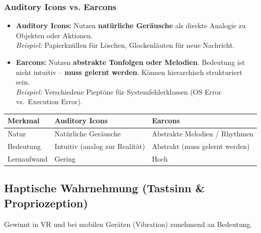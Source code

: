 \documentclass[12pt, a4paper]{article}
\begin{document}
\subsubsection{Auditory Icons vs. Earcons}

\begin{itemize}
  \item \textbf{Auditory Icons:} Nutzen \textbf{natürliche Geräusche} als direkte
        Analogie zu Objekten oder Aktionen.\\
        \textit{Beispiel:} Papierknüllen für \glqq{}Löschen\grqq{}, Glockenläuten
        für neue Nachricht.
  \item \textbf{Earcons:} Nutzen \textbf{abstrakte Tonfolgen oder Melodien}. Bedeutung
        ist nicht intuitiv -- \textbf{muss gelernt werden}. Können hierarchisch
        strukturiert sein.\\
        \textit{Beispiel:} Verschiedene Pieptöne für Systemfehlerklassen
        (\glqq{}OS Error\grqq{} vs.\ \glqq{}Execution Error\grqq{}).
\end{itemize}

\begin{center}
\begin{tabular}{p{3cm} p{5cm} p{5cm}}
\hline
\textbf{Merkmal} & \textbf{Auditory Icons} & \textbf{Earcons} \\
\hline
Natur       & Natürliche Geräusche           & Abstrakte Melodien / Rhythmen \\[3pt]
Bedeutung   & Intuitiv (analog zur Realität) & Abstrakt (muss gelernt werden) \\[3pt]
Lernaufwand & Gering                         & Hoch \\
\hline
\end{tabular}
\end{center}

\subsection{Haptische Wahrnehmung (Tastsinn \& Propriozeption)}

Gewinnt in VR und bei mobilen Geräten (Vibration) zunehmend an Bedeutung.
\end{document}
